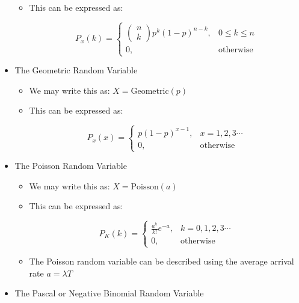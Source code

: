 \begin{itemize}
\begin{itemize}
      \item This can be expressed as:

        $$P_x(k)=\left\{ \begin{array}{ll} \left( \begin{matrix} n\\k\end{matrix} \right)p^k(1-p)^{n-k},&0\leq k\leq n\\0,&\text{otherwise}\end{array}$$

    \end{itemize}

  \item The Geometric Random Variable

    \begin{itemize}

      \item We may write this as: $X=\text{Geometric}(p)$

      \item This can be expressed as:

        $$P_x(x)=\left\{ \begin{array}{ll} p(1-p)^{x-1},&x=1,2,3\cdots\\0,&\text{otherwise}\end{array}$$

    \end{itemize}

  \item The Poisson Random Variable

    \begin{itemize}

      \item We may write this as: $X=\text{Poisson}(a)$

      \item This can be expressed as:

        $$P_K(k)=\left\{ \begin{array}{ll} \frac{a^k}{k!}e^{-a},&k=0,1,2,3\cdots\\0,&\text{otherwise}\end{array}$$

        \item The Poisson random variable can be described using the average arrival rate $a=\lambda T$

    \end{itemize}

  \item The Pascal or Negative Binomial Random Variable


\end{itemize}
